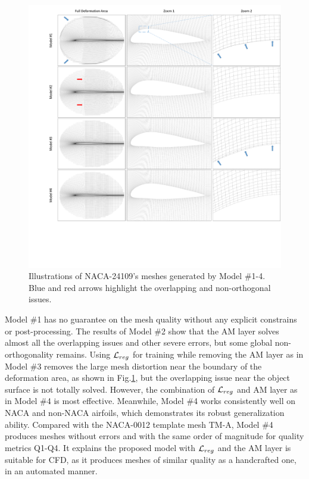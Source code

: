 \begin{figure}[!htb]
	\begin{center}
		\includegraphics[width=1\linewidth]{chapter3/tex/figures/experiment/mesh_quality_ablation.pdf}
	\end{center}
	\caption{
		\small Illustrations of NACA-24109's meshes generated by Model \#1-4. Blue and red arrows highlight the overlapping and non-orthogonal issues.
	}
	\label{ch3:fig:exp_mesh_quality}
\end{figure}

Model \#1 has no guarantee on the mesh quality without any explicit constrains or post-processing.
The results of Model \#2 show that the AM layer solves almost all the overlapping issues and other severe errors, but some global non-orthogonality remains.
Using $\mathcal{L}_{reg}$ for training while removing the AM layer as in Model \#3 removes the large mesh distortion near the boundary of the deformation area, as shown in Fig.\ref{ch3:fig:exp_mesh_quality}, but the overlapping issue near the object surface is not totally solved.
However, the combination of $\mathcal{L}_{reg}$ and AM layer as in Model \#4 is most effective.
Meanwhile, Model \#4 works consistently well on NACA and non-NACA airfoils, which demonstrates its robust generalization ability.
Compared with the NACA-0012 template mesh TM-A, Model \#4 produces meshes without errors and with the same order of magnitude for quality metrics Q1-Q4. It explains the proposed model with $\mathcal{L}_{reg}$ and the AM layer is suitable for CFD, as it produces meshes of similar quality as a handcrafted one, in an automated manner.

